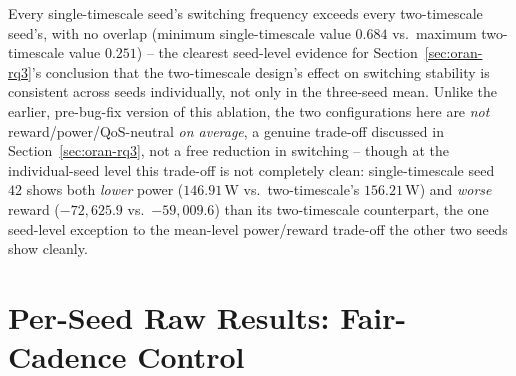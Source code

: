 \begin{table}[htbp]
\centering
\caption{Per-seed final evaluation metrics, RQ3 ablation: two-timescale
  (proposed, $N=10$) vs.\ single-timescale ($N=1$) BMPP-DQN.}
\label{tab:oran-appendix-rq3}
\end{table}

Every single-timescale seed's switching frequency exceeds every
two-timescale seed's, with no overlap (minimum single-timescale value
$0.684$ vs.\ maximum two-timescale value $0.251$) -- the clearest
seed-level evidence for Section~\ref{sec:oran-rq3}'s conclusion that the
two-timescale design's effect on switching stability is consistent across
seeds individually, not only in the three-seed mean. Unlike the earlier,
pre-bug-fix version of this ablation, the two configurations here are
\emph{not} reward/power/QoS-neutral \emph{on average}, a genuine
trade-off discussed in Section~\ref{sec:oran-rq3}, not a free reduction
in switching -- though at the individual-seed level this trade-off is
not completely clean: single-timescale seed $42$ shows both \emph{lower}
power ($146.91\,\mathrm{W}$ vs.\ two-timescale's $156.21\,\mathrm{W}$)
and \emph{worse} reward ($-72{,}625.9$ vs.\ $-59{,}009.6$) than its
two-timescale counterpart, the one seed-level exception to the
mean-level power/reward trade-off the other two seeds show cleanly.

\section{Per-Seed Raw Results: Fair-Cadence Control}
\label{sec:oran-appendix-perseed-cadence}

